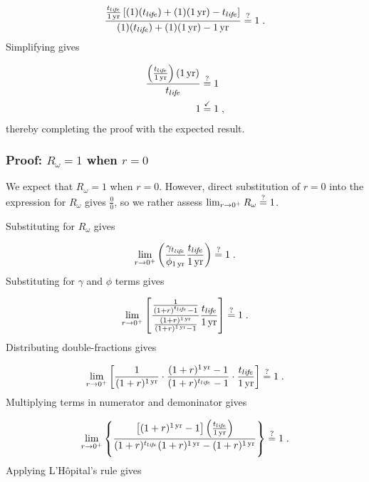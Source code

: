 \begin{equation}
  \frac{\frac{\tlife}{\oneyr}
              \left[ (1) (\tlife) + 
                     (1) (\oneyr) - 
                     \tlife
              \right]}
       {(1) (\tlife) + 
        (1) (\oneyr) - 
        \oneyr} \questionequal 1 \; .
\end{equation}
%
Simplifying gives

\begin{align}
  \frac{\left( \frac{t_{li\!f\!e}}{1\,\mathrm{yr}} \right) (1\,\mathrm{yr})}{t_{li\!f\!e}} &\stackrel{?}{=} 1 \\
  1 &\stackrel{\checkmark}{=} 1 \; ,
\end{align}
%
thereby completing the proof with the expected result. 



\subsubsection{Proof: $R_\omega = 1$ when $r = 0$}
\label{sec:proof_R_omega}

We expect that $R_\omega = 1$ when $r = 0$.
However, direct substitution of $r = 0$ into the expression
for $R_\omega$ gives $\frac{0}{0}$, 
so we rather assess
$\lim_{r \to 0^+} R_\omega \stackrel{?}{=} 1$.

Substituting for $R_\omega$ gives

\begin{equation}
  \lim_{r \to 0^+} \left( \frac{\gamma_{t_{li\!f\!e}}}{\phi_{1\,\mathrm{yr}}} \frac{t_{li\!f\!e}}{1\,\mathrm{yr}} \right) \stackrel{?}{=} 1 \; .
\end{equation}
%
Substituting for $\gamma$ and $\phi$ terms gives

\begin{equation}
  \lim_{r \to 0^+} \left[ \frac{\frac{1}{(1 + r)^{t_{li\!f\!e}} - 1}}{\frac{(1 + r)^{1\,\mathrm{yr}}}{(1 + r)^{1\,\mathrm{yr}} - 1}} \frac{t_{li\!f\!e}}{1\,\mathrm{yr}} \right] \stackrel{?}{=} 1 \; .
\end{equation}
%
Distributing double-fractions gives

\begin{equation}
  \lim_{r \to 0^+} \left[
  \frac{1}{(1 + r)^{1\,\mathrm{yr}}} \cdot
  \frac{(1 + r)^{1\,\mathrm{yr}} - 1}{(1 + r)^{t_{li\!f\!e}} - 1} \cdot
  \frac{t_{li\!f\!e}}{1\,\mathrm{yr}}
  \right] \stackrel{?}{=} 1 \; .
\end{equation}
%
Multiplying terms in numerator and demoninator gives

\begin{equation}
  \lim_{r \to 0^+} 
  \left\{
    \frac{\left[ (1 + r)^{1\,\mathrm{yr}} - 1 \right] \left( \frac{t_{li\!f\!e}}{1\,\mathrm{yr}} \right)}
    {(1 + r)^{t_{li\!f\!e}} (1 + r)^{1\,\mathrm{yr}} - (1 + r)^{1\,\mathrm{yr}}} 
  \right\} \stackrel{?}{=} 1 \; .
\end{equation}
%
Applying L'H\^{o}pital's rule gives

